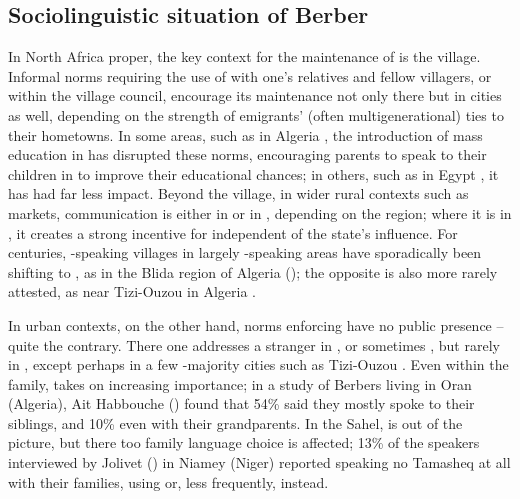 \documentclass[output=paper]{langsci/langscibook}
\begin{document}
 
 \subsection{Sociolinguistic situation of Berber}


In North Africa proper, the key context for the maintenance of  is the village. Informal norms requiring the use of  with one's relatives and fellow villagers, or within the village council, encourage its maintenance not only there but in cities as well, depending on the strength of emigrants' (often multigenerational) ties to their hometowns. In some areas, such as  in Algeria \citep{Mouili2013}, the introduction of mass education in  has disrupted these norms, encouraging parents to speak to their children in  to improve their educational chances; in others, such as  in Egypt \citep{Serreli2017}, it has had far less impact. Beyond the village, in wider rural contexts such as markets, communication is either in  or in , depending on the region; where it is in , it creates a strong incentive for  independent of the state's influence.  For centuries, -speaking villages in largely -speaking areas have sporadically been shifting to , as in the Blida region of Algeria (\citealt{ElArifi2014}); the opposite is also more rarely attested, as near Tizi-Ouzou in Algeria \citep[258]{Gautier1913}.

In urban contexts, on the other hand, norms enforcing  have no public presence – quite the contrary.  There one addresses a stranger in , or sometimes , but rarely in , except perhaps in a few -majority cities such as Tizi{}-Ouzou \citep{Tigziri2008}.  Even within the family,  takes on increasing importance; in a study of  Berbers living in Oran (Algeria), Ait Habbouche (\citeyear[79]{AitHabbouche2013}) found that 54\% said they mostly spoke  to their siblings, and 10\% even with their grandparents. In the Sahel,  is out of the picture, but there too family language choice is affected; 13\% of the  speakers interviewed by Jolivet (\citeyear[146]{Jolivet2008}) in Niamey (Niger) reported speaking no Tamasheq at all with their families, using  or, less frequently,  instead.
\end{document}
